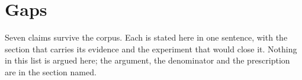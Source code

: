 \section{Gaps}
\label{sec:gaps}

Seven claims survive the corpus. Each is stated here in one sentence, with the section that carries
its evidence and the experiment that would close it. Nothing in this list is argued here; the
argument, the denominator and the prescription are in the section named.

